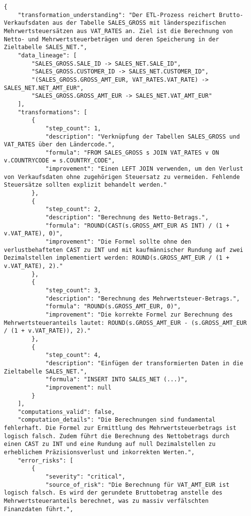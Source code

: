 \begin{lstlisting}[caption={Ausgabe: GEMINI 2.5 Pro Anwendungsfall 5 Hauptdurchlauf},label={gemini_case5_prompt1}]
{
    "transformation_understanding": "Der ETL-Prozess reichert Brutto-Verkaufsdaten aus der Tabelle SALES_GROSS mit länderspezifischen Mehrwertsteuersätzen aus VAT_RATES an. Ziel ist die Berechnung von Netto- und Mehrwertsteuerbeträgen und deren Speicherung in der Zieltabelle SALES_NET.",
    "data_lineage": [
        "SALES_GROSS.SALE_ID -> SALES_NET.SALE_ID",
        "SALES_GROSS.CUSTOMER_ID -> SALES_NET.CUSTOMER_ID",
        "(SALES_GROSS.GROSS_AMT_EUR, VAT_RATES.VAT_RATE) -> SALES_NET.NET_AMT_EUR",
        "SALES_GROSS.GROSS_AMT_EUR -> SALES_NET.VAT_AMT_EUR"
    ],
    "transformations": [
        {
            "step_count": 1,
            "description": "Verknüpfung der Tabellen SALES_GROSS und VAT_RATES über den Ländercode.",
            "formula": "FROM SALES_GROSS s JOIN VAT_RATES v ON v.COUNTRYCODE = s.COUNTRY_CODE",
            "improvement": "Einen LEFT JOIN verwenden, um den Verlust von Verkaufsdaten ohne zugehörigen Steuersatz zu vermeiden. Fehlende Steuersätze sollten explizit behandelt werden."
        },
        {
            "step_count": 2,
            "description": "Berechnung des Netto-Betrags.",
            "formula": "ROUND(CAST(s.GROSS_AMT_EUR AS INT) / (1 + v.VAT_RATE), 0)",
            "improvement": "Die Formel sollte ohne den verlustbehafteten CAST zu INT und mit kaufmännischer Rundung auf zwei Dezimalstellen implementiert werden: ROUND(s.GROSS_AMT_EUR / (1 + v.VAT_RATE), 2)."
        },
        {
            "step_count": 3,
            "description": "Berechnung des Mehrwertsteuer-Betrags.",
            "formula": "ROUND(s.GROSS_AMT_EUR, 0)",
            "improvement": "Die korrekte Formel zur Berechnung des Mehrwertsteueranteils lautet: ROUND(s.GROSS_AMT_EUR - (s.GROSS_AMT_EUR / (1 + v.VAT_RATE)), 2)."
        },
        {
            "step_count": 4,
            "description": "Einfügen der transformierten Daten in die Zieltabelle SALES_NET.",
            "formula": "INSERT INTO SALES_NET (...)",
            "improvement": null
        }
    ],
    "computations_valid": false,
    "computation_details": "Die Berechnungen sind fundamental fehlerhaft. Die Formel zur Ermittlung des Mehrwertsteuerbetrags ist logisch falsch. Zudem führt die Berechnung des Nettobetrags durch einen CAST zu INT und eine Rundung auf null Dezimalstellen zu erheblichem Präzisionsverlust und inkorrekten Werten.",
    "error_risks": [
        {
            "severity": "critical",
            "source_of_risk": "Die Berechnung für VAT_AMT_EUR ist logisch falsch. Es wird der gerundete Bruttobetrag anstelle des Mehrwertsteueranteils berechnet, was zu massiv verfälschten Finanzdaten führt.",

\end{lstlisting}
